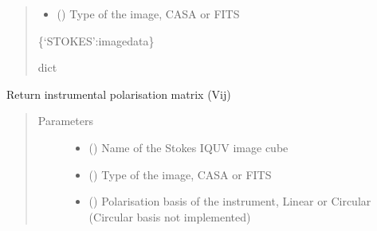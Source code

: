 \documentclass[letterpaper,10pt,english]{sphinxmanual}
\begin{document}
\begin{fulllineitems}
\begin{fulllineitems}
\begin{quote}
\begin{description}
\begin{itemize}
\item {} 
\sphinxAtStartPar
{} () \textendash{} Type of the image, CASA or FITS

\end{itemize}

\item[{Returns}] \leavevmode
\sphinxAtStartPar
\{‘STOKES’:imagedata\}

\item[{Return type}] \leavevmode
\sphinxAtStartPar
dict

\end{description}\end{quote}

\end{fulllineitems}


\begin{fulllineitems}
\label{\detokenize{paircars:paircars.fullpol_selfcal_LTS.PolSelfcal.get_inst_pols}}
\sphinxAtStartPar
Return instrumental polarisation matrix (Vij)
\begin{quote}\begin{description}
\item[{Parameters}] \leavevmode\begin{itemize}
\item {} 
\sphinxAtStartPar
{} () \textendash{} Name of the Stokes IQUV image cube

\item {} 
\sphinxAtStartPar
{} () \textendash{} Type of the image, CASA or FITS

\item {} 
\sphinxAtStartPar
{} () \textendash{} Polarisation basis of the instrument, Linear or Circular (Circular basis not implemented)


\end{itemize}
\end{description}
\end{quote}
\end{fulllineitems}
\end{fulllineitems}
\end{document}
